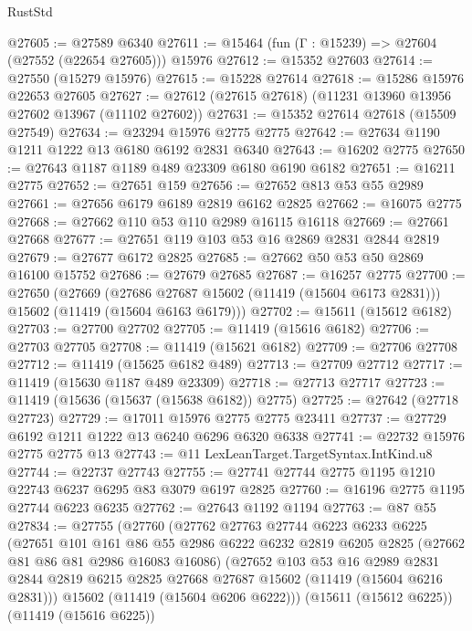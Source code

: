 \begin{lexlean}{RustStd}
\begin{coremodule}
@27605 := @27589 @6340
@27611 := @15464 (fun (Γ : @15239) => @27604 (@27552 (@22654 @27605))) @15976
@27612 := @15352 @27603
@27614 := @27550 (@15279 @15976)
@27615 := @15228 @27614
@27618 := @15286 @15976 @22653 @27605
@27627 := @27612 (@27615 @27618) (@11231 @13960 @13956 @27602 @13967 (@11102 @27602))
@27631 := @15352 @27614 @27618 (@15509 @27549)
@27634 := @23294 @15976 @2775 @2775
@27642 := @27634 @1190 @1211 @1222 @13 @6180 @6192 @2831 @6340
@27643 := @16202 @2775
@27650 := @27643 @1187 @1189 @489 @23309 @6180 @6190 @6182
@27651 := @16211 @2775
@27652 := @27651 @159
@27656 := @27652 @813 @53 @55 @2989
@27661 := @27656 @6179 @6189 @2819 @6162 @2825
@27662 := @16075 @2775
@27668 := @27662 @110 @53 @110 @2989 @16115 @16118
@27669 := @27661 @27668
@27677 := @27651 @119 @103 @53 @16 @2869 @2831 @2844 @2819
@27679 := @27677 @6172 @2825
@27685 := @27662 @50 @53 @50 @2869 @16100 @15752
@27686 := @27679 @27685
@27687 := @16257 @2775
@27700 := @27650
    (@27669
      (@27686 @27687 @15602 (@11419 (@15604 @6173 @2831)))
      @15602
      (@11419 (@15604 @6163 @6179)))
@27702 := @15611 (@15612 @6182)
@27703 := @27700 @27702
@27705 := @11419 (@15616 @6182)
@27706 := @27703 @27705
@27708 := @11419 (@15621 @6182)
@27709 := @27706 @27708
@27712 := @11419 (@15625 @6182 @489)
@27713 := @27709 @27712
@27717 := @11419 (@15630 @1187 @489 @23309)
@27718 := @27713 @27717
@27723 := @11419 (@15636 (@15637 (@15638 @6182)) @2775)
@27725 := @27642 (@27718 @27723)
@27729 := @17011 @15976 @2775 @2775 @23411
@27737 := @27729 @6192 @1211 @1222 @13 @6240 @6296 @6320 @6338
@27741 := @22732 @15976 @2775 @2775 @13
@27743 := @11 LexLeanTarget.TargetSyntax.IntKind.u8
@27744 := @22737 @27743
@27755 := @27741 @27744 @2775 @1195 @1210 @22743 @6237 @6295 @83 @3079 @6197 @2825
@27760 := @16196 @2775 @1195 @27744 @6223 @6235
@27762 := @27643 @1192 @1194
@27763 := @87 @55
@27834 := @27755
    (@27760
      (@27762
        @27763
        @27744
        @6223
        @6233
        @6225
        (@27651
          @101
          @161
          @86
          @55
          @2986
          @6222
          @6232
          @2819
          @6205
          @2825
          (@27662 @81 @86 @81 @2986 @16083 @16086)
          (@27652
            @103
            @53
            @16
            @2989
            @2831
            @2844
            @2819
            @6215
            @2825
            @27668
            @27687
            @15602
            (@11419 (@15604 @6216 @2831)))
          @15602
          (@11419 (@15604 @6206 @6222)))
        (@15611 (@15612 @6225))
        (@11419 (@15616 @6225))

\end{coremodule}
\end{lexlean}
